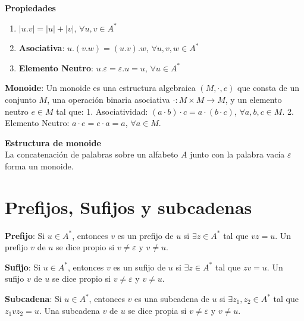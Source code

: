 \documentclass[12pt]{book} %
\providecommand{\tightlist}{%
  \setlength{\itemsep}{0pt}\setlength{\parskip}{0pt}}
\begin{document}
\textbf{Propiedades}

\begin{enumerate}
\def\labelenumi{\arabic{enumi}.}
\tightlist
\item
  \(\lvert u.v \rvert = \lvert u \rvert + \lvert v \rvert\),
  \(\forall u, v \in A^*\)\\
\item
  \textbf{Asociativa}: \(u.(v.w) = (u.v).w\),
  \(\forall u, v, w \in A^*\)\\
\item
  \textbf{Elemento Neutro}: \(u.\varepsilon = \varepsilon.u = u\),
  \(\forall u \in A^*\)
\end{enumerate}

\begin{definicion}
\textbf{Monoide}: Un monoide es una estructura algebraica $(M, \cdot, e)$ que consta de un conjunto $M$, una operación binaria asociativa $\cdot : M \times M \to M$, y un elemento neutro $e \in M$ tal que:  
1. Asociatividad: $(a \cdot b) \cdot c = a \cdot (b \cdot c)$, $\forall a, b, c \in M$.  
2. Elemento Neutro: $a \cdot e = e \cdot a = a$, $\forall a \in M$.  
\end{definicion}

\textbf{Estructura de monoide}\\
La concatenación de palabras sobre un alfabeto \(A\) junto con la
palabra vacía \(\varepsilon\) forma un monoide.

\hypertarget{prefijos-sufijos-y-subcadenas}{%
\section{Prefijos, Sufijos y
subcadenas}\label{prefijos-sufijos-y-subcadenas}}

\begin{definicion}
\textbf{Prefijo}: Si $u \in A^*$, entonces $v$ es un prefijo de $u$ si $\exists z \in A^*$ tal que $vz = u$.  
Un prefijo $v$ de $u$ se dice propio si $v \neq \varepsilon$ y $v \neq u$.  
\end{definicion}

\begin{definicion}
\textbf{Sufijo}: Si $u \in A^*$, entonces $v$ es un sufijo de $u$ si $\exists z \in A^*$ tal que $zv = u$.  
Un sufijo $v$ de $u$ se dice propio si $v \neq \varepsilon$ y $v \neq u$.  
\end{definicion}

\begin{definicion}
\textbf{Subcadena}: Si $u \in A^*$, entonces $v$ es una subcadena de $u$ si $\exists z_1, z_2 \in A^*$ tal que $z_1vz_2 = u$.  
Una subcadena $v$ de $u$ se dice propia si $v \neq \varepsilon$ y $v \neq u$.  
\end{definicion}
\end{document}
